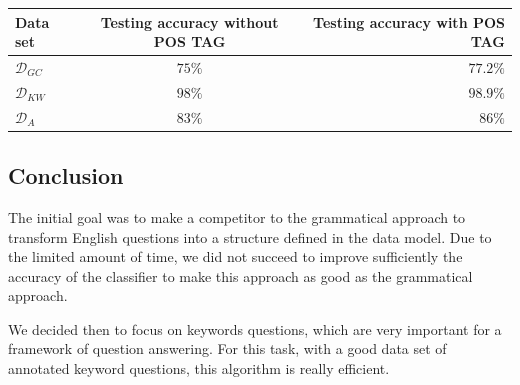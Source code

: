 \begin{center}
\begin{tabular}{|l|c|r|}
  \hline
  Data set & Testing accuracy without POS TAG & Testing accuracy with POS TAG \\
  \hline
  $\mathcal{D}_{GC}$ &  $75\%$& $77.2\%$  \\
  $\mathcal{D}_{KW}$ & $98\%$ & $98.9\%$ \\
  $\mathcal{D}_{A}$    & $83\%$ & $86\%$ \\
  \hline
\end{tabular}
\end{center}


\subsection{Conclusion}

The initial goal was to make a competitor to the grammatical approach to transform English questions into a structure defined in the data model. Due to the limited amount of time, we did not succeed to improve sufficiently the accuracy of the classifier to make this approach as good as the grammatical approach.

We decided then to focus on keywords questions, which are very important for a framework of question answering. For this task, with a good data set of annotated keyword questions, this algorithm is really efficient.

